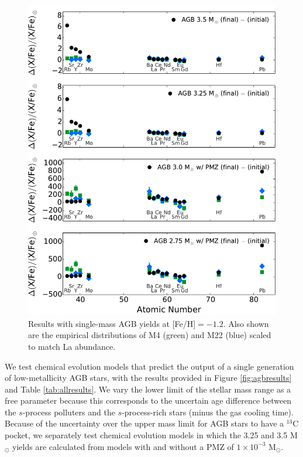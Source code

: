 \begin{figure}
 \begin{center}\includegraphics[width=\textwidth]{f7.pdf}\end{center}
 \caption{Results with single-mass AGB yields at [Fe/H]$=-1.2$. Also shown are the empirical distributions of M4 (green) and M22 (blue) scaled to match La abundance.}
 \label{fig:agbindividualresults}
\end{figure}

We test chemical evolution models that predict the output of a single generation of low-metallicity AGB stars, with the results provided in Figure \ref{fig:agbresults} and Table \ref{tab:allresults}. We vary the lower limit of the stellar mass range as a free parameter because this corresponds to the uncertain age difference between the $s$-process polluters and the $s$-process-rich stars (minus the gas cooling time). Because of the uncertainty over the upper mass limit for AGB stars to have a $^{13}$C pocket, we separately test chemical evolution models in which the 3.25 and 3.5 M$_\odot$ yields are calculated from models with and without a PMZ of $1 \times 10^{-3}$ M$_\odot$.

